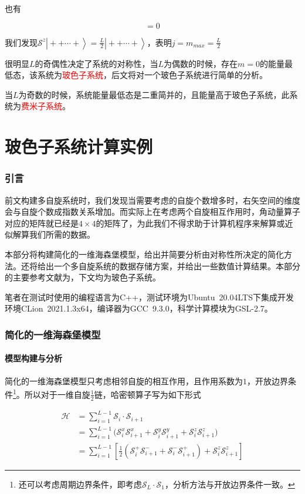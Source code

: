 \documentclass[UTF8,12pt]{article}
\providecommand\Ket[1]{\left|\right. #1 \left.\right\rangle}
\numberwithin{equation}{subsection}
\providecommand{\empR}[1]{\textcolor{red}{#1}}
\providecommand{\sumL}{\sum\limits}
\begin{document}
	也有
	\begin{snugshade}
		\begin{equation}
			[\mathcal S^2,\mathcal S^z]=0
			\label{multiSz}
		\end{equation}
	\end{snugshade}
	
	我们发现$\mathcal S^z\Ket{++\cdots+}=\frac{L}{2}\Ket{++\cdots+}$，表明$j=m_{max}=\frac{L}{2}$
	
	很明显$L$的奇偶性决定了系统的对称性，当$L$为偶数的时候，存在$m=0$的能量最低态，该系统为\empR{玻色子系统}，后文将对一个玻色子系统进行简单的分析。
	
	当$L$为奇数的时候，系统能量最低态是二重简并的，且能量高于玻色子系统，此系统为\empR{费米子系统}。
	\newpage
	\part{玻色子系统计算实例}
	\section{引言}
		前文构建多自旋系统时，我们发现当需要考虑的自旋个数增多时，右矢空间的维度会与自旋个数成指数关系增加。而实际上在考虑两个自旋相互作用时，角动量算子对应的矩阵就已经是$4\times 4$的矩阵了，为此我们不得求助于计算机程序来解算或近似解算我们所需的数据。
		
		本部分将构建简化的一维海森堡模型，给出并简要分析由对称性所决定的简化方法。还将给出一个多自旋系统的数据存储方案，并给出一些数值计算结果。本部分的主要参考文献为\parencite{Bose}，下文均为玻色子系统。
		
		笔者在测试时使用的编程语言为C++，测试环境为Ubuntu~20.04LTS下集成开发环境CLion~2021.1.3x64，编译器为GCC~9.3.0，科学计算模块为GSL-2.7。
		
		\newpage
	\section{简化的一维海森堡模型}
		\subsection{模型构建与分析}
		简化的一维海森堡模型只考虑相邻自旋的相互作用，且作用系数为$1$，开放边界条件\footnote{还可以考虑周期边界条件，即考虑$\mathcal S_L\cdot\mathcal S_1$，分析方法与开放边界条件一致。}。所以对于一维自旋$\frac{1}{2}$链，哈密顿算子写为如下形式
		\begin{snugshade}
			\begin{equation}
				\begin{aligned}
					\mathcal H &= \sumL^{L-1}_{i=1}\mathcal S_i\cdot \mathcal S_{i+1}\\
					&= \sumL^{L-1}_{i=1}\Big(\mathcal S^x_i\mathcal S^x_{i+1}+\mathcal S^y_i\mathcal S^y_{i+1}+\mathcal S^z_i\mathcal S^z_{i+1}\Big)\\
					&= \sumL^{L-1}_{i=1}\left[ \frac{1}{2}(\mathcal S^+_i\mathcal S^-_{i+1}+\mathcal S^-_i\mathcal S^+_{i+1})+\mathcal S^z_i\mathcal S^z_{i+1}\right]
				\end{aligned}
				\label{Hamiltonian}
			\end{equation}
		\end{snugshade}
		
\end{document}
